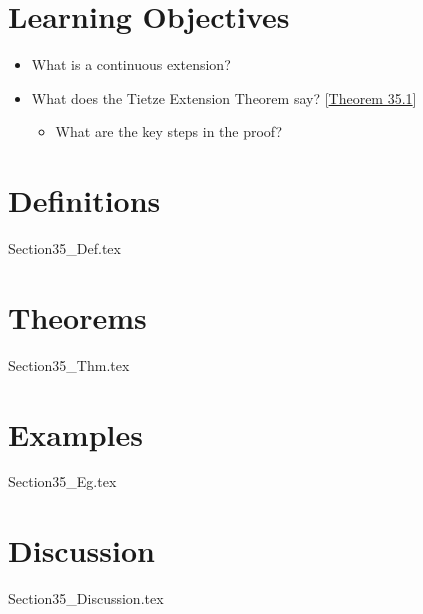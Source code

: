 \section{Learning Objectives}

\begin{itemize}
    \item What is a continuous extension?
    \item What does the Tietze Extension Theorem say?
        [\hyperlink{thm:35.1}{Theorem 35.1}]
        \begin{itemize}
            \item What are the key steps in the proof?
        \end{itemize}
\end{itemize}

\section{Definitions}

{Section35_Def.tex}

\section{Theorems}

{Section35_Thm.tex}

\section{Examples}

{Section35_Eg.tex}

\section{Discussion}

{Section35_Discussion.tex}